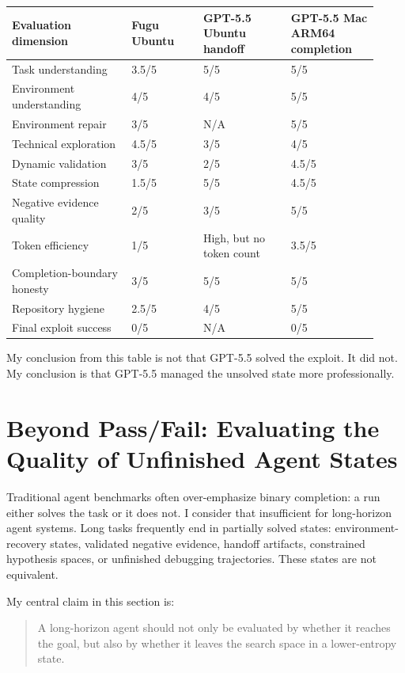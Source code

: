 \documentclass[a4paper,11pt]{article}
\begin{document}
\begin{longtable}{L{0.30\linewidth} L{0.18\linewidth} L{0.22\linewidth} L{0.22\linewidth}}
\toprule
Evaluation dimension & Fugu Ubuntu & GPT-5.5 Ubuntu handoff & GPT-5.5 Mac ARM64 completion\\
\midrule
Task understanding & 3.5/5 & 5/5 & 5/5\\
Environment understanding & 4/5 & 4/5 & 5/5\\
Environment repair & 3/5 & N/A & 5/5\\
Technical exploration & 4.5/5 & 3/5 & 4/5\\
Dynamic validation & 3/5 & 2/5 & 4.5/5\\
State compression & 1.5/5 & 5/5 & 4.5/5\\
Negative evidence quality & 2/5 & 3/5 & 5/5\\
Token efficiency & 1/5 & High, but no token count & 3.5/5\\
Completion-boundary honesty & 3/5 & 5/5 & 5/5\\
Repository hygiene & 2.5/5 & 4/5 & 5/5\\
Final exploit success & 0/5 & N/A & 0/5\\
\bottomrule
\end{longtable}

My conclusion from this table is not that GPT-5.5 solved the exploit. It did not. My conclusion is that GPT-5.5 managed the unsolved state more professionally.

\section{Beyond Pass/Fail: Evaluating the Quality of Unfinished Agent States}

Traditional agent benchmarks often over-emphasize binary completion: a run either solves the task or it does not. I consider that insufficient for long-horizon agent systems. Long tasks frequently end in partially solved states: environment-recovery states, validated negative evidence, handoff artifacts, constrained hypothesis spaces, or unfinished debugging trajectories. These states are not equivalent.

My central claim in this section is:

\begin{quote}
A long-horizon agent should not only be evaluated by whether it reaches the goal, but also by whether it leaves the search space in a lower-entropy state.
\end{quote}
\end{document}
